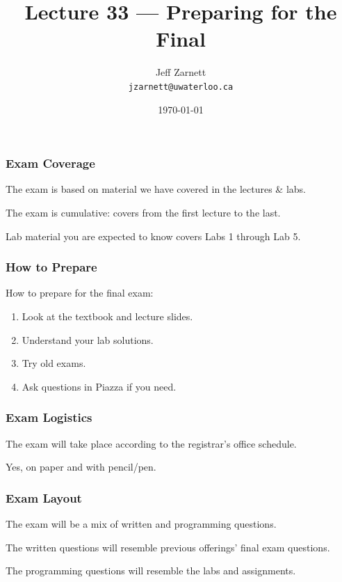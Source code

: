 

\title{Lecture 33 --- Preparing for the Final }

\author{Jeff Zarnett \\ \small \texttt{jzarnett@uwaterloo.ca}}
\date{\today}




\begin{frame}
  \titlepage

\end{frame}

\begin{frame}
\frametitle{Exam Coverage}

The exam is based on material we have covered in the lectures \& labs.

The exam is cumulative: covers from the first lecture to the last.

Lab material you are expected to know covers Labs 1 through Lab 5.

\end{frame}

\begin{frame}
\frametitle{How to Prepare}

How to prepare for the final exam:

\begin{enumerate}
	\item Look at the textbook and lecture slides.
	\item Understand your lab solutions.
	\item Try old exams.
	\item Ask questions in Piazza if you need.
\end{enumerate}

\end{frame}


\begin{frame}
\frametitle{Exam Logistics}

The exam will take place according to the registrar's office schedule.

Yes, on paper and with pencil/pen.

\end{frame}


\begin{frame}
\frametitle{Exam Layout}

The exam will be a mix of written and programming questions.

The written questions will resemble previous offerings' final exam questions.

The programming questions will resemble the labs and assignments.

\end{frame}


